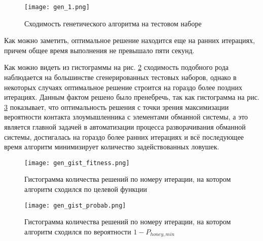 \begin{figure}[ht]
\centering
	\texttt{[image: gen\_1.png]}  
	\caption{Сходимость генетического алгоритма на тестовом наборе}
	\label{fig:gen_1}
\end{figure}

Как можно заметить, оптимальное решение находится еще на ранних итерациях, причем общее время выполнения не превышало пяти секунд.

Как можно видеть из гистограммы на рис. \ref{fig:gen_gist_fitness} сходимость подобного рода наблюдается на большинстве сгенерированных тестовых наборов, однако в некоторых случаях оптимальное решение строится на гораздо более поздних итерациях. Данным фактом решено было пренебречь, так как гистограмма на рис. \ref{fig:gen_gist_probab} показывает, что оптимальность решения с точки зрения максимизации вероятности контакта злоумышленника с элементами обманной системы, а это является главной задачей в автоматизации процесса разворачивания обманной системы, достигалась на гораздо более ранних итерациях и всё последующее время алгоритм минимизирует количество задействованных ловушек.

\begin{figure}[ht]
\centering
	\texttt{[image: gen\_gist\_fitness.png]}  
	\caption{Гистограмма количества решений по номеру итерации, на котором алгоритм сходился по целевой функции}
	\label{fig:gen_gist_fitness}
\end{figure}

\begin{figure}[ht]
\centering
	\texttt{[image: gen\_gist\_probab.png]}  
	\caption{Гистограмма количества решений по номеру итерации, на котором алгоритм сходился по вероятности $1 - P_{honey, min}$}
	\label{fig:gen_gist_probab}
\end{figure}
